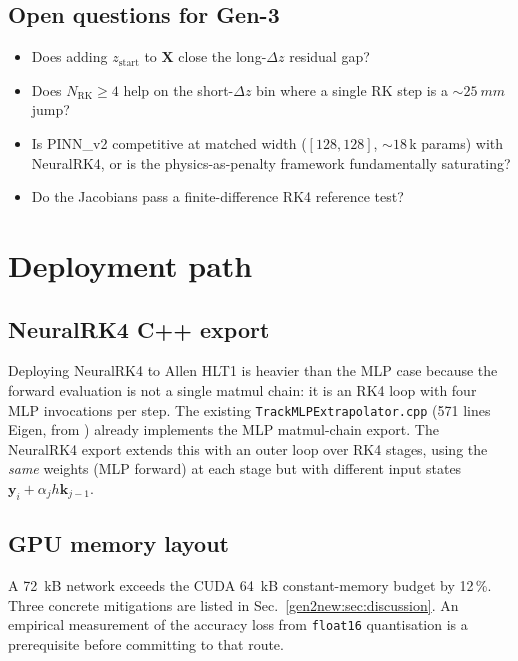\documentclass[a4paper,11pt]{article}
\newcommand{\SI}[2]{#1~#2}
\newcommand{\dz}{\Delta z}
\newcommand{\state}{\mathbf{y}}
\begin{document}
\subsection{Open questions for Gen-3}

\begin{itemize}
\item Does adding $z_{\mathrm{start}}$ to $\mathbf{X}$ close the
  long-$\dz$ residual gap?
\item Does $N_{\mathrm{RK}}\geq4$ help on the short-$\dz$ bin where
  a single RK step is a ${\sim}\SI{25}{mm}$ jump?
\item Is PINN\_v2 competitive at matched width
  ($[128,128]$, ${\sim}18$\,k params) with NeuralRK4, or is the
  physics-as-penalty framework fundamentally saturating?
\item Do the Jacobians pass a finite-difference RK4 reference test?
\end{itemize}

\section{Deployment path}\label{gen2new:sec:deployment}

\subsection{NeuralRK4 C++ export}

Deploying NeuralRK4 to Allen HLT1 is heavier than the MLP case
because the forward evaluation is not a single matmul chain: it is an
RK4 loop with four MLP invocations per step. The existing
\texttt{TrackMLPExtrapolator.cpp} (571 lines Eigen, from
\cite{gen1report}) already implements the MLP matmul-chain export.
The NeuralRK4 export extends this with an outer loop over RK4 stages,
using the \emph{same} weights (MLP forward) at each stage but with
different input states $\state_i+\alpha_j h\mathbf{k}_{j-1}$.

\subsection{GPU memory layout}

A \SI{72}{kB} network exceeds the CUDA \SI{64}{kB} constant-memory
budget by 12\,\%. Three concrete mitigations are listed in
Sec.~\ref{gen2new:sec:discussion}. An empirical measurement of the
accuracy loss from \texttt{float16} quantisation is a prerequisite
before committing to that route.
\end{document}
